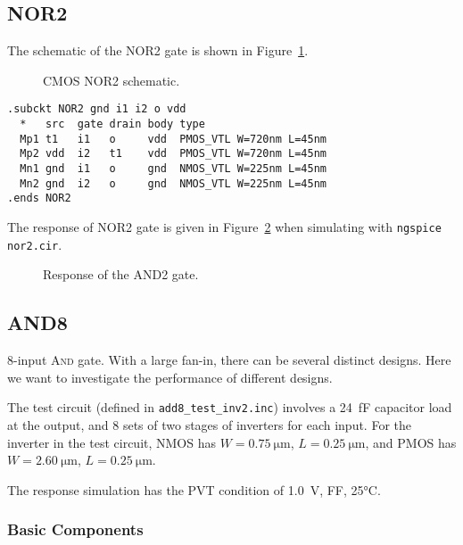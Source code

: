 \documentclass{scrartcl}
\newcommand{\includeres}[1]{\sffamily\scriptsize\vspace{-2em}}
\begin{document}
      \newpage

    \subsection{NOR2}

      The schematic of the NOR2 gate is shown in Figure~\ref{fig:nor2}.
      \begin{figure}[htbp]
        \centering
        
        \caption{CMOS NOR2 schematic.}
        \label{fig:nor2}
      \end{figure}

      \begin{lstlisting}[title={NOR2 Subcircuit}]
.subckt NOR2 gnd i1 i2 o vdd
  *   src  gate drain body type
  Mp1 t1   i1   o     vdd  PMOS_VTL W=720nm L=45nm
  Mp2 vdd  i2   t1    vdd  PMOS_VTL W=720nm L=45nm
  Mn1 gnd  i1   o     gnd  NMOS_VTL W=225nm L=45nm
  Mn2 gnd  i2   o     gnd  NMOS_VTL W=225nm L=45nm
.ends NOR2
      \end{lstlisting}

      The response of NOR2 gate is given in Figure~\ref{fig:nor2_res}
      when simulating with \texttt{ngspice nor2.cir}.
      \begin{figure}[htbp]
        \includeres{nor2}
        \caption{Response of the AND2 gate.}
        \label{fig:nor2_res}
      \end{figure}

      \newpage
      \subsection{AND8}

      8-input \textsc{And} gate.
      With a large fan-in, there can be several distinct designs.
      Here we want to investigate the performance of different designs.

      The test circuit (defined in \texttt{add8\_test\_inv2.inc})
      involves a \qty{24}{fF} capacitor load at the output,
      and 8 sets of two stages of inverters for each input.
      For the inverter in the test circuit,
      NMOS has $W=\qty{0.75}{\um}$, $L=\qty{0.25}{\um}$,
      and PMOS has $W=\qty{2.60}{\um}$, $L=\qty{0.25}{\um}$.

      The response simulation has the PVT condition of \qty{1.0}{V}, FF, 25°C.

      \subsubsection{Basic Components}
\end{document}
